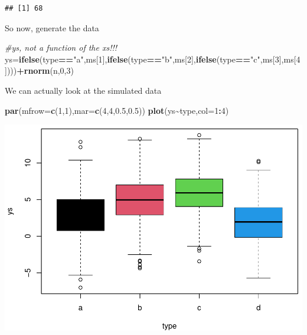 \documentclass[
]{book}
\newenvironment{Shaded}{\begin{snugshade}}{\end{snugshade}}
\newcommand{\AttributeTok}[1]{\textcolor[rgb]{0.13,0.29,0.53}{#1}}
\newcommand{\CommentTok}[1]{\textcolor[rgb]{0.56,0.35,0.01}{\textit{#1}}}
\newcommand{\DecValTok}[1]{\textcolor[rgb]{0.00,0.00,0.81}{#1}}
\newcommand{\FloatTok}[1]{\textcolor[rgb]{0.00,0.00,0.81}{#1}}
\newcommand{\FunctionTok}[1]{\textcolor[rgb]{0.13,0.29,0.53}{\textbf{#1}}}
\newcommand{\NormalTok}[1]{#1}
\newcommand{\OtherTok}[1]{\textcolor[rgb]{0.56,0.35,0.01}{#1}}
\newcommand{\SpecialCharTok}[1]{\textcolor[rgb]{0.81,0.36,0.00}{\textbf{#1}}}
\newcommand{\StringTok}[1]{\textcolor[rgb]{0.31,0.60,0.02}{#1}}
\begin{document}
\begin{verbatim}
## [1] 68
\end{verbatim}

So now, generate the data

\begin{Shaded}
\begin{Highlighting}[]
\CommentTok{\#ys, not a function of the xs!!!}
\NormalTok{ys}\OtherTok{=}\FunctionTok{ifelse}\NormalTok{(type}\SpecialCharTok{==}\StringTok{"a"}\NormalTok{,ms[}\DecValTok{1}\NormalTok{],}\FunctionTok{ifelse}\NormalTok{(type}\SpecialCharTok{==}\StringTok{"b"}\NormalTok{,ms[}\DecValTok{2}\NormalTok{],}\FunctionTok{ifelse}\NormalTok{(type}\SpecialCharTok{==}\StringTok{"c"}\NormalTok{,ms[}\DecValTok{3}\NormalTok{],ms[}\DecValTok{4}\NormalTok{])))}\SpecialCharTok{+}\FunctionTok{rnorm}\NormalTok{(n,}\DecValTok{0}\NormalTok{,}\DecValTok{3}\NormalTok{)}
\end{Highlighting}
\end{Shaded}

We can actually look at the simulated data

\begin{Shaded}
\begin{Highlighting}[]
\FunctionTok{par}\NormalTok{(}\AttributeTok{mfrow=}\FunctionTok{c}\NormalTok{(}\DecValTok{1}\NormalTok{,}\DecValTok{1}\NormalTok{),}\AttributeTok{mar=}\FunctionTok{c}\NormalTok{(}\DecValTok{4}\NormalTok{,}\DecValTok{4}\NormalTok{,}\FloatTok{0.5}\NormalTok{,}\FloatTok{0.5}\NormalTok{))}
\FunctionTok{plot}\NormalTok{(ys}\SpecialCharTok{\textasciitilde{}}\NormalTok{type,}\AttributeTok{col=}\DecValTok{1}\SpecialCharTok{:}\DecValTok{4}\NormalTok{)}
\end{Highlighting}
\end{Shaded}

\includegraphics{ECOMODbook_files/figure-latex/a8.26-1.pdf}
\end{document}
